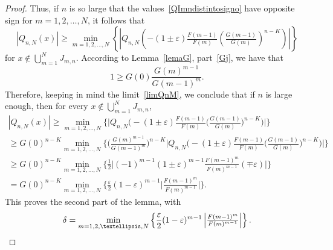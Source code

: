 \documentclass[10pt,a4paper]{amsart}
\newcommand{\eps}{\varepsilon}
\begin{document}
\begin{proof}
Thus, if $n$ is so large that the values~\eqref{QImndistintosigno} have opposite sign for $m=1,2,\dots,N$, it follows that
\[
  |Q_{n,N}(x)| \ge \min_{m=1,2,\dots,N}\left\{
  \left|Q_{n,N}\left( -(1\pm \eps) \tfrac{F(m-1)}{F(m)} 
  \left( \tfrac{G(m-1)}{G(m)} \right)^{n-K} \right)\right|
  \right\}
\]
for $x \notin \bigcup_{m=1}^N J_{m,n}$. According to Lemma~\ref{lemaG}, part~\eqref{Gj},
we have that
\[
  1 \ge G(0) \frac{G(m)^{m-1}}{G(m-1)^m}.
\]
Therefore, keeping in mind the limit~\eqref{limQnM}, we conclude that if $n$ is large enough, then for every $x \notin \bigcup_{m=1}^N J_{m,n}$,
\begin{multline*}
  |Q_{n,N}(x)| \ge \min_{m=1,2,\dots,N}\Big\{
  \Big|Q_{n,N}\Big( -(1\pm \eps) \tfrac{F(m-1)}{F(m)} \Big( \tfrac{G(m-1)}{G(m)} \Big)^{n-K} \Big)\Big|
  \Big\}
  \\
  \ge G(0)^{n-K} \min_{m=1,2,\dots,N}\Big\{
  \Big( \tfrac{G(m)^{m-1}}{G(m-1)^m} \Big)^{n-K}
  \Big| Q_{n,N}\Big( -(1\pm \eps) \tfrac{F(m-1)}{F(m)} 
  \Big( \tfrac{G(m-1)}{G(m)} \Big)^{n-K} \Big)\Big|
  \Big\}
  \\
  \ge G(0)^{n-K} \min_{m=1,2,\dots,N}\Big\{
  \frac{1}{2} \Big|
  (-1)^{m-1} (1\pm \eps)^{m-1} \tfrac{F(m-1)^m}{F(m)^{m-1}}
  (\mp \eps)
  \Big|
  \Big\}
  \\
  = G(0)^{n-K} \min_{m=1,2,\dots,N} \Big\{ \frac{\eps}{2} (1 - \eps)^{m-1} 
  \Big|\tfrac{F(m-1)^m}{F(m)^{m-1}} \Big| \Big\}.
\end{multline*}
This proves the second part of the lemma, with
\[
  \delta = \min_{m=1,2,\dots,N} \left\{
  \frac{\eps}{2} (1 - \eps)^{m-1} \left|\tfrac{F(m-1)^m}{F(m)^{m-1}}\right|
  \right\}.
  \qedhere
\]
\end{proof}
\end{document}
